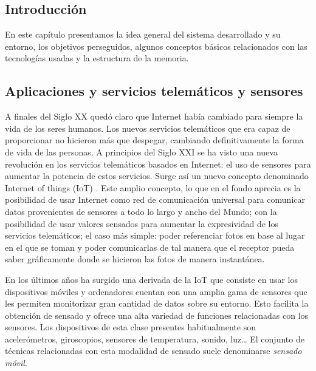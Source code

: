 \clearpage
{}%
\begin{center}
\begin{minipage}{.75\textwidth}
\section{Introducción}
En este capítulo presentamos la idea general del sistema desarrollado y su entorno, los objetivos perseguidos, algunos conceptos básicos relacionados con las tecnologías usadas y la estructura de la memoria.%
\end{minipage}
\end{center}
\clearpage%

\subsection{Aplicaciones y servicios telemáticos y sensores}

A finales del Siglo XX quedó claro que Internet había cambiado para siempre la vida de los seres humanos. Los nuevos servicios telemáticos que era capaz de proporcionar no hicieron más que despegar, cambiando definitivamente la forma de vida de las personas. A principios del Siglo XXI se ha visto una nueva revolución en los servicios telemáticos basados en Internet: el uso de sensores para aumentar la potencia de estos servicios. Surge así un nuevo concepto denominado Internet of things (\acrshort{IoT}) \cite{IOT2}. Este amplio concepto, lo que en el fondo aprecia es la posibilidad de usar Internet como red de comunicación universal para comunicar datos provenientes de sensores a todo lo largo y ancho del Mundo; con la posibilidad de usar valores sensados para aumentar la expresividad de los servicios telemáticos; el caso más simple: poder referenciar fotos en base al lugar en el que se toman y poder comunicarlas de tal manera que el receptor pueda saber gráficamente donde se hicieron las fotos de manera instantánea.

En los últimos años ha surgido una derivada de la IoT que consiste en usar los dispositivos móviles y ordenadores cuentan con una amplia gama de sensores que les permiten monitorizar gran cantidad de datos sobre su entorno. Esto facilita la obtención de sensado y ofrece una alta variedad de funciones relacionadas con los sensores. Los dispositivos de esta clase presentes habitualmente son acelerómetros, giroscopios, sensores de temperatura, sonido, luz… El conjunto de técnicas relacionadas con esta modalidad de sensado suele denominarse \emph{sensado móvil}.

